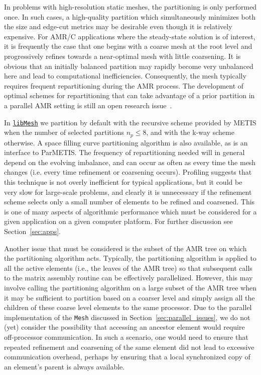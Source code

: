 \documentclass[global,twocolumn,final]{svjour}
\newcommand{\libMesh}{\href{http://libmesh.sourceforge.net}{\texttt{lib\-Mesh}}}
\begin{document}
In problems with high-resolution static meshes, the partitioning is
only performed once.  In such cases, a high-quality 
partition which simultaneously minimizes both the
size and edge-cut metrics may be desirable even though it is
relatively expensive.  For AMR/C
applications where the steady-state solution is of interest, it is
frequently the case that one begins with a coarse mesh at the root
level and progressively refines towards a near-optimal mesh with
little coarsening. It is obvious that an initially balanced partition
may rapidly become very unbalanced here and lead to computational
inefficiencies. Consequently, the mesh typically requires frequent
repartitioning during the AMR process. The development of optimal
schemes for
repartitioning that can take advantage of a prior partition in a
parallel AMR setting is still an open research
issue~\cite{iqbal_carey_2005}.

In \libMesh{} we partition by default with the recursive scheme
provided by METIS when the number of selected partitions $n_p \leq8$,
and with the k-way scheme otherwise.  A space filling curve
partitioning algorithm is also available, as is an interface to
ParMETIS.  The frequency of repartitioning needed will in general
depend on the evolving imbalance, and can occur as often as every time
the mesh changes (i.e. every time refinement or coarsening occurs).
Profiling suggests that this technique is not overly inefficient for
typical applications, but it could be very slow for large-scale
problems, and clearly it is unnecessary if the refinement scheme
selects only a small number of elements to be refined and
coarsened. This is one of many aspects of algorithmic performance
which must be considered for a given application on a given computer
platform.  For further discussion see Section~\ref{sec:apps}.

Another issue that must be considered is the subset of the AMR tree on
which the partitioning algorithm acts. Typically, the partitioning
algorithm is applied to all the active elements (i.e., the leaves of
the AMR tree) so that subsequent calls to the matrix assembly routine
can be effectively parallelized.  However, this may involve calling
the partitioning algorithm on a large subset of the AMR tree when it may
be sufficient to partition based on a coarser level and simply assign
all the children of these coarse level elements to the same processor.
Due to the parallel implementation of the \texttt{Mesh} discussed in
Section~\ref{sec:parallel_issues}, we do not (yet) consider the
possibility that accessing an ancestor element would require
off-processor communication.  In such a scenario, one would need to
ensure that repeated refinement and coarsening of the same element
did not lead to excessive communication overhead, perhaps by ensuring
that a local synchronized copy of an element's parent is always available.
\end{document}
